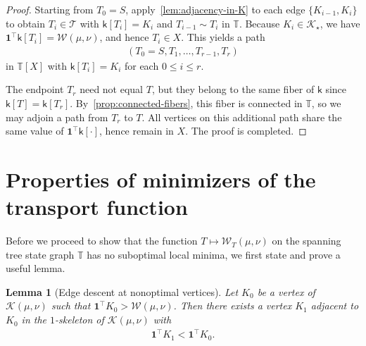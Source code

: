 \documentclass[11pt,a4paper]{article}
\newcommand{\wass}{{\mathcal{W}}}
\newcommand{\setoftrees}{{\mathcal{T}}}
\newcommand{\stategraph}{{\mathbb{T}}}
\newcommand{\embedding}{{\mathsf{k}}}
\newcommand{\flowpoly}{{\mathcal{K}}}
\newtheorem{lemma}[theorem]{Lemma}
\begin{document}
\begin{proof}
        Starting from $T_0 = S$, apply~\cref{lem:adjacency-in-K} to each edge $\{K_{i-1},K_i\}$ to obtain $T_i\in\setoftrees$ with $\embedding[T_i]=K_i$ and $T_{i-1}\sim T_i$ in $\stategraph$. Because $K_i\in\flowpoly_\star$, we have $\mathbf{1}^\top \embedding[T_i] = \wass(\mu,\nu)$, and hence $T_i\in X$. This yields a path
            \begin{align*}
                (T_0 = S, T_1, \dotsc, T_{r-1}, T_{r})
            \end{align*}
        in $\stategraph[X]$ with $\embedding[T_i]=K_i$ for each $0\le i\le r$.

        The endpoint $T_{r}$ need not equal $T$, but they belong to the same fiber of $\embedding$ since $\embedding[T]=\embedding[T_r]$. By~\cref{prop:connected-fibers}, this fiber is connected in $\stategraph$, so we may adjoin a path from $T_{r}$ to $T$. All vertices on this additional path share the same value of $\mathbf{1}^\top \embedding[\cdot]$, hence remain in $X$. The proof is completed.
    \end{proof}

\section{Properties of minimizers of the transport function}\label{sec:no-local-minima}

Before we proceed to show that the function $T\mapsto \wass_T(\mu,\nu)$ on the spanning tree state graph $\stategraph$ has no suboptimal local minima, we first state and prove a useful lemma.

\begin{lemma}[Edge descent at nonoptimal vertices]\label{lem:edge-descent-polytope}
    Let $K_0$ be a vertex of $\flowpoly(\mu,\nu)$ such that $\mathbf{1}^\top K_0 > \wass(\mu,\nu)$. Then there exists a vertex $K_1$ adjacent to $K_0$ in the $1$-skeleton of $\flowpoly(\mu,\nu)$ with
        \begin{align*}
            \mathbf{1}^\top K_1 < \mathbf{1}^\top K_0.
        \end{align*}
\end{lemma}
\end{document}
